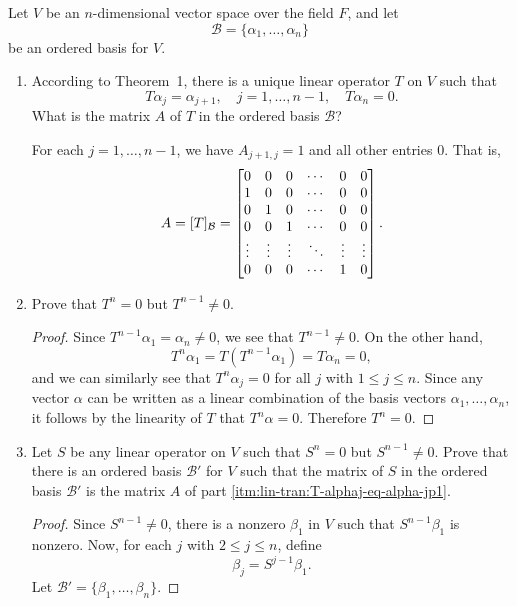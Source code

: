  Let $V$ be an $n$-dimensional vector space over the
field $F$, and let
\begin{equation*}
  \mathcal{B} = \{\alpha_1,\dots,\alpha_n\}
\end{equation*}
be an ordered basis for $V$.
\begin{enumerate}
\item \label{itm:lin-tran:T-alphaj-eq-alpha-jp1} According to
  Theorem~1, there is a unique linear operator $T$ on $V$ such that
  \begin{equation*}
    T\alpha_j = \alpha_{j+1}, \quad
    j = 1, \dots, n-1, \quad
    T\alpha_n = 0.
  \end{equation*}
  What is the matrix $A$ of $T$ in the ordered basis $\mathcal{B}$?
  \begin{solution}
    For each $j = 1, \dots, n-1$, we have $A_{j+1,j} = 1$ and all
    other entries $0$. That is,
    \begin{equation*}
      A = [T]_{\mathcal{B}} =
      \begin{bmatrix}
        0 & 0 & 0 & \cdots & 0 & 0 \\
        1 & 0 & 0 & \cdots & 0 & 0 \\
        0 & 1 & 0 & \cdots & 0 & 0 \\
        0 & 0 & 1 & \cdots & 0 & 0 \\
        \vdots & \vdots & \vdots & \ddots & \vdots & \vdots \\
        0 & 0 & 0 & \cdots & 1 & 0
      \end{bmatrix}. \qedhere
    \end{equation*}
  \end{solution}

\item Prove that $T^n = 0$ but $T^{n-1}\neq0$.
  \begin{proof}
    Since $T^{n-1}\alpha_1 = \alpha_n \neq 0$, we see that
    $T^{n-1}\neq0$. On the other hand,
    \begin{equation*}
      T^n\alpha_1 = T(T^{n-1}\alpha_1) = T\alpha_n = 0,
    \end{equation*}
    and we can similarly see that $T^n\alpha_j = 0$ for all $j$ with
    $1\leq j\leq n$. Since any vector $\alpha$ can be written as a
    linear combination of the basis vectors $\alpha_1,\dots,\alpha_n$,
    it follows by the linearity of $T$ that $T^n\alpha = 0$. Therefore
    $T^n = 0$.
  \end{proof}

\item Let $S$ be any linear operator on $V$ such that $S^n = 0$ but
  $S^{n-1}\neq0$. Prove that there is an ordered basis $\mathcal{B}'$
  for $V$ such that the matrix of $S$ in the ordered basis
  $\mathcal{B}'$ is the matrix $A$ of part
  \ref{itm:lin-tran:T-alphaj-eq-alpha-jp1}.
  \begin{proof}
    Since $S^{n-1}\neq0$, there is a nonzero $\beta_1$ in $V$ such
    that $S^{n-1}\beta_1$ is nonzero. Now, for each $j$ with
    $2\leq j\leq n$, define
    \begin{equation*}
      \beta_j = S^{j-1}\beta_1.
    \end{equation*}
    Let $\mathcal{B}' = \{\beta_1,\dots,\beta_n\}$.


\end{proof}
\end{enumerate}
